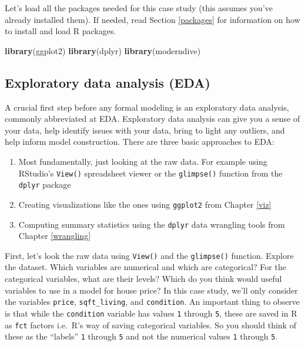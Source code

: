 \documentclass[12pt,]{krantz}
\makeatletter
\newenvironment{Shaded}{\begin{snugshade}}{\end{snugshade}}
\newcommand{\KeywordTok}[1]{\textcolor[rgb]{0.27,0.27,0.27}{\textbf{#1}}}
\newcommand{\NormalTok}[1]{#1}
\providecommand{\tightlist}{%
  \setlength{\itemsep}{0pt}\setlength{\parskip}{0pt}}
\newenvironment{kframe}{%
\medskip{}
\setlength{\fboxsep}{.8em}
 \def\at@end@of@kframe{}%
 \ifinner\ifhmode%
  \def\at@end@of@kframe{\end{minipage}}%
  \begin{minipage}{\columnwidth}%
 \fi\fi%
 \def\FrameCommand##1{\hskip\@totalleftmargin \hskip-\fboxsep
 \colorbox{shadecolor}{##1}\hskip-\fboxsep
     \hskip-\linewidth \hskip-\@totalleftmargin \hskip\columnwidth}%
 \MakeFramed {\advance\hsize-\width
   \@totalleftmargin\z@ \linewidth\hsize
   \@setminipage}}%
 {\par\unskip\endMakeFramed%
 \at@end@of@kframe}
\renewenvironment{Shaded}{\begin{kframe}}{\end{kframe}}
\makeatother
\begin{document}
Let's load all the packages needed for this case study (this assumes
you've already installed them). If needed, read Section \ref{packages}
for information on how to install and load R packages.

\begin{Shaded}
\begin{Highlighting}[]
\KeywordTok{library}\NormalTok{(ggplot2)}
\KeywordTok{library}\NormalTok{(dplyr)}
\KeywordTok{library}\NormalTok{(moderndive)}
\end{Highlighting}
\end{Shaded}

\subsection{Exploratory data analysis (EDA)}\label{house-prices-EDA-I}

A crucial first step before any formal modeling is an exploratory data
analysis, commonly abbreviated at EDA. Exploratory data analysis can
give you a sense of your data, help identify issues with your data,
bring to light any outliers, and help inform model construction. There
are three basic approaches to EDA:

\begin{enumerate}
\def\labelenumi{\arabic{enumi}.}
\tightlist
\item
  Most fundamentally, just looking at the raw data. For example using
  RStudio's \texttt{View()} spreadsheet viewer or the \texttt{glimpse()}
  function from the \texttt{dplyr} package
\item
  Creating visualizations like the ones using \texttt{ggplot2} from
  Chapter \ref{viz}
\item
  Computing summary statistics using the \texttt{dplyr} data wrangling
  tools from Chapter \ref{wrangling}
\end{enumerate}

First, let's look the raw data using \texttt{View()} and the
\texttt{glimpse()} function. Explore the dataset. Which variables are
numerical and which are categorical? For the categorical variables, what
are their levels? Which do you think would useful variables to use in a
model for house price? In this case study, we'll only consider the
variables \texttt{price}, \texttt{sqft\_living}, and \texttt{condition}.
An important thing to observe is that while the \texttt{condition}
variable has values \texttt{1} through \texttt{5}, these are saved in R
as \texttt{fct} factors i.e.~R's way of saving categorical variables. So
you should think of these as the ``labels'' \texttt{1} through
\texttt{5} and not the numerical values \texttt{1} through \texttt{5}.
\end{document}
